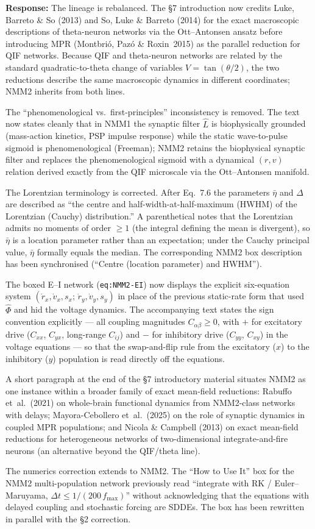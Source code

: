 \documentclass[12pt,a4paper]{article}
\newcommand{\ourresponse}[1]{\par\noindent\textbf{Response:} #1\par\medskip}
\begin{document}
\ourresponse{The lineage is rebalanced. The §7 introduction now credits Luke, Barreto \& So (2013) and So, Luke \& Barreto (2014) for the exact macroscopic descriptions of theta-neuron networks via the Ott--Antonsen ansatz before introducing MPR (Montbri\'o, Paz\'o \& Roxin~2015) as the parallel reduction for QIF networks. Because QIF and theta-neuron networks are related by the standard quadratic-to-theta change of variables $V=\tan(\theta/2)$, the two reductions describe the same macroscopic dynamics in different coordinates; NMM2 inherits from both lines.

The ``phenomenological vs.\ first-principles'' inconsistency is removed. The text now states cleanly that in NMM1 the synaptic filter $\hat L$ is biophysically grounded (mass-action kinetics, PSP impulse response) while the static wave-to-pulse sigmoid is phenomenological (Freeman); NMM2 retains the biophysical synaptic filter and replaces the phenomenological sigmoid with a dynamical $(r,v)$ relation derived exactly from the QIF microscale via the Ott--Antonsen manifold.

The Lorentzian terminology is corrected. After Eq.~7.6 the parameters $\bar\eta$ and $\Delta$ are described as ``the centre and half-width-at-half-maximum (HWHM) of the Lorentzian (Cauchy) distribution.'' A parenthetical notes that the Lorentzian admits no moments of order $\ge 1$ (the integral defining the mean is divergent), so $\bar\eta$ is a location parameter rather than an expectation; under the Cauchy principal value, $\bar\eta$ formally equals the median. The corresponding NMM2 box description has been synchronised (``Centre (location parameter) and HWHM'').

The boxed E--I network (\Verb|eq:NMM2-EI|) now displays the explicit six-equation system $(\dot r_x,\dot v_x,s_x;\,\dot r_y,\dot v_y,s_y)$ in place of the previous static-rate form that used $\hat\Phi$ and hid the voltage dynamics. The accompanying text states the sign convention explicitly --- all coupling magnitudes $C_{\alpha\beta}\ge 0$, with $+$ for excitatory drive ($C_{xx}$, $C_{yx}$, long-range $C_{ij}$) and $-$ for inhibitory drive ($C_{yy}$, $C_{xy}$) in the voltage equations --- so that the swap-and-flip rule from the excitatory ($x$) to the inhibitory ($y$) population is read directly off the equations.

A short paragraph at the end of the §7 introductory material situates NMM2 as one instance within a broader family of exact mean-field reductions: Rabuffo et~al.~(2021) on whole-brain functional dynamics from NMM2-class networks with delays; Mayora-Cebollero et~al.~(2025) on the role of synaptic dynamics in coupled MPR populations; and Nicola \& Campbell (2013) on exact mean-field reductions for heterogeneous networks of two-dimensional integrate-and-fire neurons (an alternative beyond the QIF/theta line).

The numerics correction extends to NMM2. The ``How to Use It'' box for the NMM2 multi-population network previously read ``integrate with RK / Euler--Maruyama, $\Delta t\le 1/(200\,f_{\max})$'' without acknowledging that the equations with delayed coupling and stochastic forcing are SDDEs. The box has been rewritten in parallel with the §2 correction.}
\end{document}
